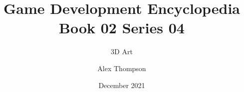\documentclass{scrbook}
\begin{document}
	
	\title{Game Development Encyclopedia Book 02 Series 04}
	\subtitle{3D Art}
	\author{Alex Thompson}
	\date{December 2021}
	
	\frontmatter
	
	\maketitle
	\tableofcontents
	
	\mainmatter
	
\end{document}
